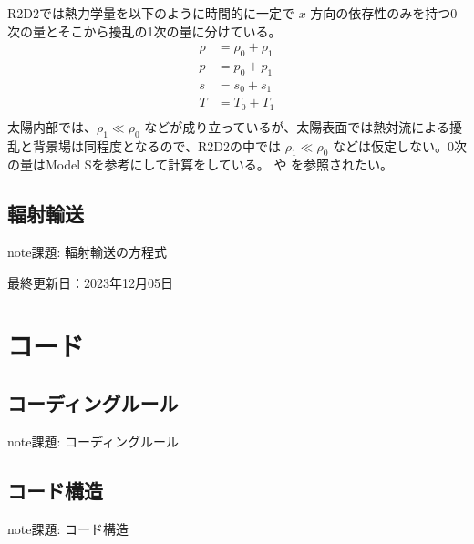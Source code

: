 \documentclass[letterpaper,10pt,dvipdfmx,report]{sphinxmanual}
\begin{document}
\sphinxAtStartPar
R2D2では熱力学量を以下のように時間的に一定で \(x\) 方向の依存性のみを持つ0次の量とそこから擾乱の1次の量に分けている。
\begin{equation*}
\begin{split}\rho &= \rho_0 + \rho_1 \\
p &= p_0 + p_1 \\
s &= s_0 + s_1 \\
T &= T_0 + T_1 \\\end{split}
\end{equation*}
\sphinxAtStartPar
太陽内部では、\(\rho_1 \ll \rho_0\) などが成り立っているが、太陽表面では熱対流による擾乱と背景場は同程度となるので、R2D2の中では \(\rho_1 \ll \rho_0\) などは仮定しない。0次の量はModel Sを参考にして計算をしている。 や  を参照されたい。


\section{輻射輸送}
\label{\detokenize{equation:id3}}
\begin{sphinxadmonition}{note}{\label{\detokenize{equation:id4}}課題:}
\sphinxAtStartPar
輻射輸送の方程式
\end{sphinxadmonition}

\sphinxAtStartPar
最終更新日：2023年12月05日

\sphinxstepscope


\chapter{コード}
\label{\detokenize{code:id1}}\label{\detokenize{code::doc}}

\section{コーディングルール}
\label{\detokenize{code:id2}}
\begin{sphinxadmonition}{note}{\label{\detokenize{code:id3}}課題:}
\sphinxAtStartPar
コーディングルール
\end{sphinxadmonition}


\section{コード構造}
\label{\detokenize{code:id4}}
\begin{sphinxadmonition}{note}{\label{\detokenize{code:id5}}課題:}
\sphinxAtStartPar
コード構造
\end{sphinxadmonition}
\end{document}
